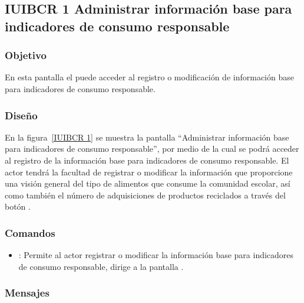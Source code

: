 \subsection{IUIBCR 1 Administrar información base para indicadores de consumo responsable}

\subsubsection{Objetivo}
	
    En esta pantalla el  puede acceder al registro o modificación de información base para indicadores de consumo responsable.

\subsubsection{Diseño}

    En la figura~\ref{IUIBCR 1} se muestra la pantalla ``Administrar información base para indicadores de consumo responsable'', por medio de la cual se podrá acceder al registro de la información base para indicadores de consumo responsable. El actor tendrá la facultad de registrar o modificar la información que proporcione una visión general del tipo de alimentos que consume la comunidad escolar, así como también el número de adquisiciones de productos reciclados a través del botón \botEdit.  



\subsubsection{Comandos}
    \begin{itemize}
	\item {}: Permite al actor registrar o modificar la información base para indicadores de consumo responsable, dirige a la pantalla . 
    \end{itemize}

\subsubsection{Mensajes}

